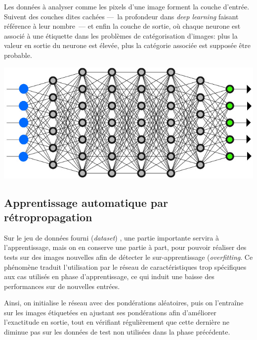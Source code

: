 \documentclass[a4paper,11pt]{article} %
\begin{document}
Les données à analyser comme les pixels d'une image forment la couche d'entrée. Suivent des couches dites cachées ---~la profondeur dans \og \emph{deep learning}\fg{} faisant référence à leur nombre~--- et enfin la couche de sortie, où chaque neurone est associé à une étiquette dans les problèmes de catégorisation d'images: plus la valeur en sortie du neurone est élevée, plus la catégorie associée est supposée être probable.
\begin{center}
    \includegraphics[width=0.7\linewidth]{deep-learning.png}
\end{center}
%
\subsection{Apprentissage automatique par rétropropagation}
%
Sur le jeu de données fourni (\emph{dataset}) , une partie importante servira à l'apprentissage, mais on en conserve une partie à part, pour pouvoir réaliser des tests sur des images nouvelles afin de détecter le sur-apprentissage (\emph{overfitting}. Ce phénomène traduit l'utilisation par le réseau de caractéristiques trop spécifiques aux cas utilisés en phase d'apprentissage, ce qui induit une baisse des performances sur de nouvelles entrées.

Ainsi, on initialise le réseau avec des pondérations aléatoires, puis on l'entraîne sur les images étiquetées en ajustant ses pondérations afin d'améliorer l'exactitude en sortie, tout en vérifiant régulièrement que cette dernière ne diminue pas sur les données de test non utilisées dans la phase précédente.
\end{document}
